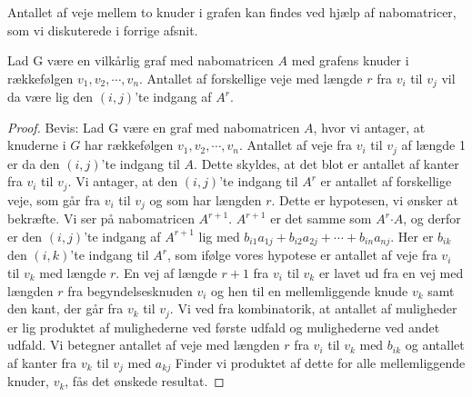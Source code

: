 Antallet af veje mellem to knuder i grafen kan findes ved hjælp af nabomatricer, som vi diskuterede i forrige afsnit.
\begin{thm}
Lad G være en vilkårlig graf med nabomatricen
\textbf{$A$} med grafens knuder i rækkefølgen $v_{1},v_{2},\cdots,v_{n}$. Antallet af forskellige veje med længde $r$ fra $v_{i}$ til $v_{j}$ vil da være lig den $(i,j)$'te indgang af \textbf{$A^{r}$}.
\end{thm}

\begin{proof}
Bevis: Lad G være en graf med nabomatricen 
\textbf{$A$}, hvor vi antager, at knuderne i $G$ har rækkefølgen $v_{1},v_{2},\cdots,v_{n}$. Antallet af veje fra $v_{i}$ til $v_{j}$ af længde 1 er da den $(i,j)$'te indgang til 
\textbf{$A$}. Dette skyldes, at det blot er antallet af kanter fra $v_{i}$ til $v_{j}$.
Vi antager, at den $(i,j)$'te indgang til 
\textbf{${A^r}$} er antallet af forskellige veje, som går fra $v_{i}$ til $v_{j}$ og som har længden $r$. Dette er hypotesen, vi ønsker at bekræfte.
Vi ser på nabomatricen \textbf{$A^{r+1}$}. 
\textbf{$A^{r+1}$} er det samme som 
\textbf{$A^{r}$}$\cdot$\textbf{$A$}, og derfor er den $(i,j)$'te indgang af \textbf{$A^{r+1}$} lig med $b_{i1}a_{1j} + b_{i2}a_{2j} +\cdots+ b_{in}a_{nj}$. Her er $b_{ik}$  den $(i,k)$'te indgang til 
\textbf{$A^{r}$}, som ifølge vores hypotese er antallet af veje fra $v_{i}$ til $v_{k}$ med længde $r$.
En vej af længde $r + 1$ fra $v_{i}$ til $v_{k}$ er lavet ud fra en vej med længden $r$ fra begyndelsesknuden $v_{i}$ og hen til en mellemliggende knude $v_{k}$ samt den kant, der går fra $v_{k}$ til $v_{j}$. Vi ved fra kombinatorik, at antallet af muligheder er lig produktet af mulighederne ved første udfald og mulighederne ved andet udfald. Vi betegner antallet af veje med længden $r$ fra $v_{i}$ til $v_{k}$ med $b_{ik}$ og antallet af kanter fra $v_{k}$ til $v_{j}$ med $a_{kj}$ Finder vi produktet af dette for alle mellemliggende knuder, $v_{k}$, fås det ønskede resultat.
\end{proof}

